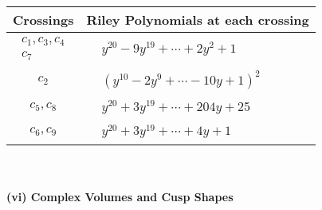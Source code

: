 \documentclass[1p]{elsarticle_modified}
\theoremstyle{definition}
\begin{document}
\begin{tabular}{m{50pt}|m{274pt}}
Crossings & \hspace{64pt}Riley Polynomials at each crossing \\
\hline $$\begin{aligned}c_{1},c_{3},c_{4}\\c_{7}\end{aligned}$$&$\begin{aligned}
&y^{20}-9 y^{19}+\cdots+2 y^2+1
\end{aligned}$\\
\hline $$\begin{aligned}c_{2}\end{aligned}$$&$\begin{aligned}
&(y^{10}-2 y^9+\cdots-10 y+1)^{2}
\end{aligned}$\\
\hline $$\begin{aligned}c_{5},c_{8}\end{aligned}$$&$\begin{aligned}
&y^{20}+3 y^{19}+\cdots+204 y+25
\end{aligned}$\\
\hline $$\begin{aligned}c_{6},c_{9}\end{aligned}$$&$\begin{aligned}
&y^{20}+3 y^{19}+\cdots+4 y+1
\end{aligned}$\\
\hline
\end{tabular}\\~\\
\newpage\flushleft \textbf{(vi) Complex Volumes and Cusp Shapes}
\end{document}
